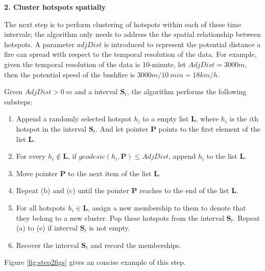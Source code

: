 \textbf{2. Cluster hotspots spatially}

The next step is to perform clustering of hotspots within each of these
time intervals; the algorithm only needs to address the the spatial
relationship between hotspots. A parameter \(adjDist\) is introduced to
represent the potential distance a fire can spread with respect to the
temporal resolution of the data. For example, given the temporal
resolution of the data is \(10\)-minute, let \(AdjDist = 3000 m\), then
the potential speed of the bushfire is \(3000m/10~min = 18km/h\).

Given \(AdjDist>0~m\) and a interval \(\boldsymbol{S}_t\), the algorithm
performs the following substeps:

\begin{enumerate}
\def\labelenumi{(\alph{enumi})}
\item
  Append a randomly selected hotspot \(h_i\) to a empty list
  \(\boldsymbol{L}\), where \(h_i\) is the \(i\)th hotspot in the
  interval \(\boldsymbol{S}_t\). And let pointer \(\boldsymbol{P}\)
  points to the first element of the list \(\boldsymbol{L}\).
\item
  For every \(h_i \notin \boldsymbol{L}\), if
  \(geodesic(h_i, \boldsymbol{P})\leq AdjDist\), append \(h_i\) to the
  list \(\boldsymbol{L}\).
\item
  Move pointer \(\boldsymbol{P}\) to the next item of the list
  \(\boldsymbol{L}\).
\item
  Repeat (b) and (c) until the pointer \(\boldsymbol{P}\) reaches to the
  end of the list \(\boldsymbol{L}\).
\item
  For all hotspots \(h_i \in \boldsymbol{L}\), assign a new membership
  to them to denote that they belong to a new cluster. Pop these
  hotspots from the interval \(\boldsymbol{S}_t\). Repeat (a) to (e) if
  interval \(\boldsymbol{S}_t\) is not empty.
\item
  Recover the interval \(\boldsymbol{S}_t\) and record the memberships.
\end{enumerate}

Figure \ref{fig:step2figs} gives an concise example of this step.

